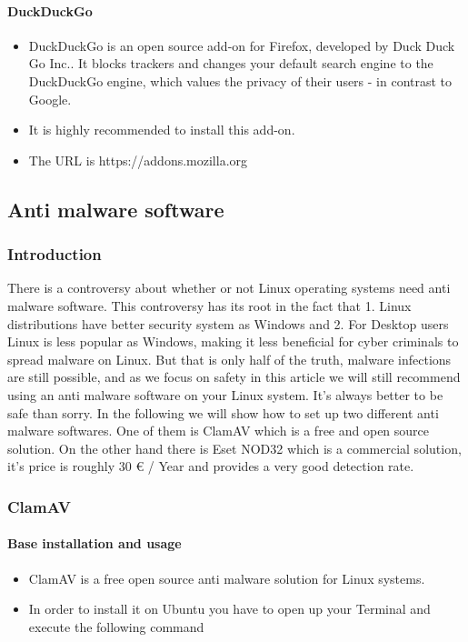 \documentclass[a4paper,10pt]{article}
\begin{document}
\paragraph{DuckDuckGo}
\begin{itemize}[leftmargin=*]
\item DuckDuckGo is an open source add-on for Firefox, developed by Duck Duck Go Inc.. It blocks trackers and changes your default search engine to the DuckDuckGo engine, which values the privacy of their users - in contrast to Google. 
\item It is highly recommended to install this add-on.
\item The URL is https://addons.mozilla.org
\end{itemize}


\subsection{Anti malware software}
\subsubsection*{Introduction}
There is a controversy about whether or not Linux operating systems need anti malware software. This controversy has its root in the fact that 1. Linux distributions have better security system as Windows and 2. For Desktop users Linux is less popular as Windows, making it less beneficial for cyber criminals to spread malware on Linux. But that is only half of the truth, malware infections are still possible, and as we focus on safety in this article we will still recommend using an anti malware software on your Linux system.\cite{mircolanglinuxav} It's always better to be safe than sorry. In the following we will show how to set up two different anti malware softwares. One of them is ClamAV which is a free and open source solution. On the other hand there is Eset NOD32 which is a commercial solution, it's price is roughly 30 € / Year and provides a very good detection rate.




\subsubsection{ClamAV}

\paragraph{Base installation and usage}
\begin{itemize}[leftmargin=*]
\item ClamAV is a free open source anti malware solution for Linux systems.
\item In order to install it on Ubuntu you have to open up your Terminal and execute the following command
\end{itemize}
\end{document}
